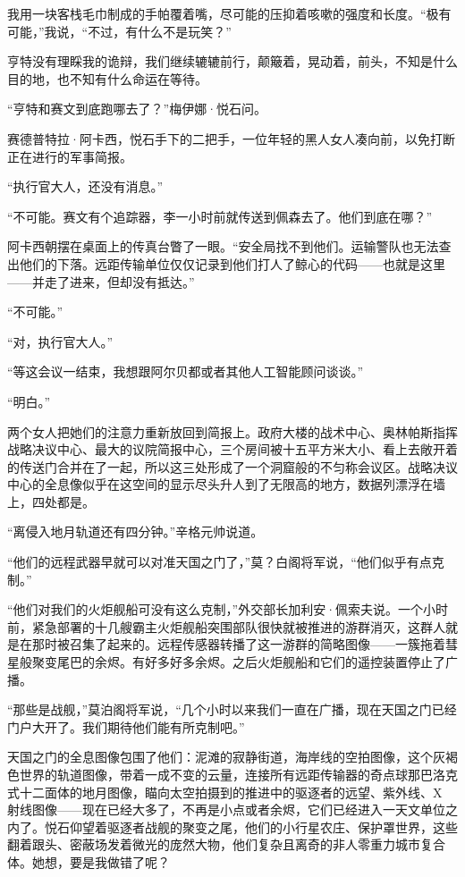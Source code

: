 \documentclass[AutoFakeBold=true]{book}
\begin{document}
我用一块客栈毛巾制成的手帕覆着嘴，尽可能的压抑着咳嗽的强度和长度。``极有可能，''我说，``不过，有什么不是玩笑？''

亨特没有理睬我的诡辩，我们继续辘辘前行，颠簸着，晃动着，前头，不知是什么目的地，也不知有什么命运在等待。

\vspace*{1em}

``亨特和赛文到底跑哪去了？''梅伊娜·悦石问。

赛德普特拉·阿卡西，悦石手下的二把手，一位年轻的黑人女人凑向前，以免打断正在进行的军事简报。

``执行官大人，还没有消息。''

``不可能。赛文有个追踪器，李一小时前就传送到佩森去了。他们到底在哪？''

阿卡西朝摆在桌面上的传真台瞥了一眼。``安全局找不到他们。运输警队也无法查出他们的下落。远距传输单位仅仅记录到他们打人了鲸心的代码——也就是这里——并走了进来，但却没有抵达。''

``不可能。''

``对，执行官大人。''

``等这会议一结束，我想跟阿尔贝都或者其他人工智能顾问谈谈。''

``明白。''

两个女人把她们的注意力重新放回到简报上。政府大楼的战术中心、奥林帕斯指挥战略决议中心、最大的议院简报中心，三个房间被十五平方米大小、看上去敞开着的传送门合并在了一起，所以这三处形成了一个洞窟般的不匀称会议区。战略决议中心的全息像似乎在这空间的显示尽头升人到了无限高的地方，数据列漂浮在墙上，四处都是。

``离侵入地月轨道还有四分钟。''辛格元帅说道。

``他们的远程武器早就可以对准天国之门了，''莫？白阁将军说，``他们似乎有点克制。''

``他们对我们的火炬舰船可没有这么克制，''外交部长加利安·佩索夫说。一个小时前，紧急部署的十几艘霸主火炬舰船突围部队很快就被推进的游群消灭，这群人就是在那时被召集了起来的。远程传感器转播了这一游群的简略图像——一簇拖着彗星般聚变尾巴的余烬。有好多好多余烬。之后火炬舰船和它们的遥控装置停止了广播。

``那些是战舰，''莫泊阁将军说，``几个小时以来我们一直在广播，现在天国之门已经门户大开了。我们期待他们能有所克制吧。''

天国之门的全息图像包围了他们：泥滩的寂静街道，海岸线的空拍图像，这个灰褐色世界的轨道图像，带着一成不变的云量，连接所有远距传输器的奇点球那巴洛克式十二面体的地月图像，瞄向太空拍摄到的推进中的驱逐者的远望、紫外线、X 射线图像——现在已经大多了，不再是小点或者余烬，它们已经进入一天文单位之内了。悦石仰望着驱逐者战舰的聚变之尾，他们的小行星农庄、保护罩世界，这些翻着跟头、密蔽场发着微光的庞然大物，他们复杂且离奇的非人零重力城市复合体。她想，{\kaishu 要是我做错了呢？}
\end{document}
